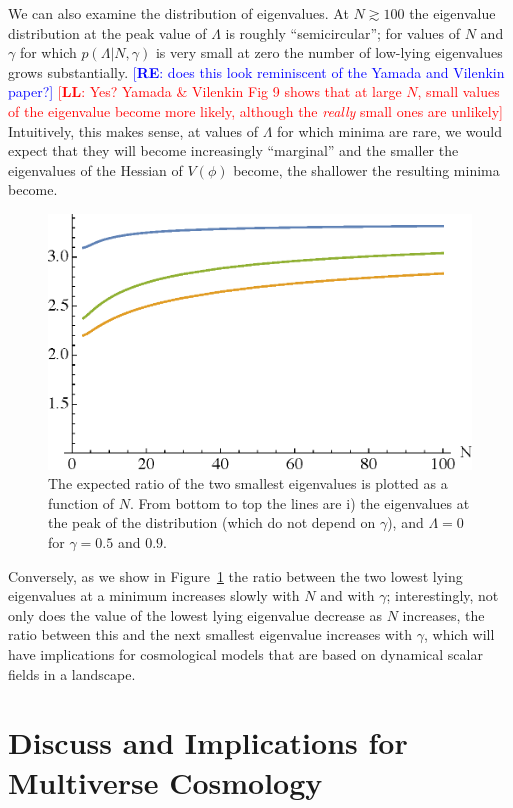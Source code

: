 \documentclass[12pt]{article}
\newcommand{\re}[1]{\textcolor{blue}{[{\bf RE}: #1]}}
\newcommand{\lfl}[1]{\textcolor{red}{[{\bf LL}: #1]}}
\begin{document}
We can also examine the distribution of eigenvalues. At  $N\gtrsim 100$ the eigenvalue distribution at the peak value of $\Lambda$ is roughly ``semicircular''; for values of $N$ and $\gamma$ for which $p(\Lambda|N,\gamma)$ is very small at zero the number of low-lying eigenvalues grows substantially. \re{does this look reminiscent of the Yamada and Vilenkin paper?} \lfl{Yes? Yamada \& Vilenkin Fig 9 shows that at large $N$, small values of the eigenvalue become more likely, although the \emph{really} small ones are unlikely} Intuitively, this makes sense, at values of $\Lambda$ for which minima are rare, we would expect that they will become increasingly ``marginal'' and the smaller the eigenvalues of the Hessian of $V(\phi)$ become, the shallower the resulting minima become. 

\begin{figure} 
  \centering
  \includegraphics[width=.6\linewidth]{ratio.eps}  
  \caption{The expected ratio of the two smallest eigenvalues is plotted as a function of $N$.   From bottom to top the lines are i) the eigenvalues at the peak  of the distribution (which do not depend on $\gamma$), and $\Lambda=0$ for $\gamma =0.5$ and $0.9$.}
  \label{ratio}
\end{figure}

Conversely, as we show in Figure~\ref{ratio} the ratio between the two lowest lying eigenvalues at a minimum increases slowly with $N$ and with $\gamma$; interestingly, not only does the value of the lowest lying eigenvalue decrease as  $N$ increases, the ratio between this and the next smallest eigenvalue increases with $\gamma$, which will have implications for cosmological models that are based on dynamical scalar fields in a landscape. 





 
\section{Discuss and Implications for Multiverse Cosmology}
\end{document}
